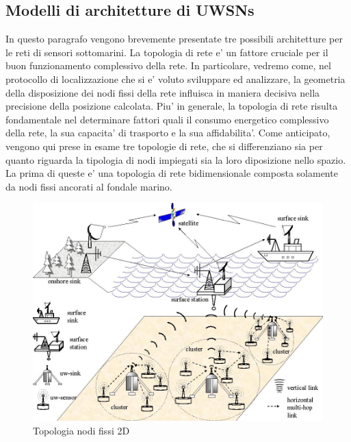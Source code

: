 \subsection{Modelli di architetture di UWSNs}
In questo paragrafo vengono brevemente presentate tre possibili architetture per le reti di sensori sottomarini. \newline La topologia di rete e' un fattore cruciale per il buon funzionamento complessivo della rete. In particolare, vedremo come, nel protocollo di localizzazione che si e' voluto sviluppare ed analizzare, la geometria della disposizione dei nodi fissi della rete influisca in maniera decisiva nella precisione della posizione calcolata. \newline Piu' in generale, la topologia di rete risulta fondamentale nel determinare fattori quali il consumo energetico complessivo della rete, la sua capacita' di trasporto e la sua affidabilita'. \newline Come anticipato, vengono qui prese in esame tre topologie di rete, che si differenziano sia per quanto riguarda la tipologia di nodi impiegati sia la loro diposizione nello spazio. \newline La prima di queste e' una topologia di rete bidimensionale composta solamente da nodi fissi ancorati al fondale marino.

\begin{figure}[H]
    \centering
	\includegraphics[scale=0.3]{2D_arch.jpg}
	\caption{ Topologia nodi fissi 2D}
	\label{fig:}
\end{figure}

